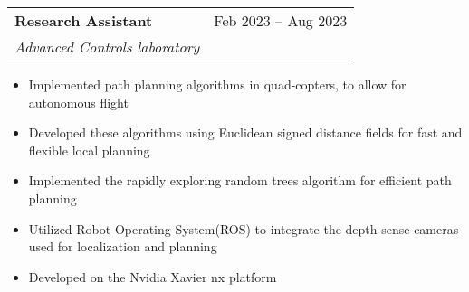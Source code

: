 \documentclass[letterpaper,10pt]{article}
\makeatletter
\newcommand{\resumeItem}[1]{
  \item\small{
    {#1 \vspace{-2pt}}
  }
}
\newcommand{\resumeSubheading}[4]{
  \vspace{-2pt}\item
    \begin{tabular*}{0.97\textwidth}[t]{l@{\extracolsep{\fill}}r}
      \textbf{#1} & #2 \\
      \textit{\small#3} & \textit{\small #4} \\
    \end{tabular*}\vspace{-7pt}
}
\newcommand{\resumeItemListStart}{\begin{itemize}}
\newcommand{\resumeItemListEnd}{\end{itemize}\vspace{-5pt}}
\makeatother
\begin{document}
\resumeSubheading
{\normalsize Research Assistant}{Feb 2023 -- Aug 2023}
{Advanced Controls laboratory}{}
\resumeItemListStart
\resumeItem{Implemented path planning algorithms in quad-copters, to allow for autonomous flight}
\resumeItem{Developed these algorithms using Euclidean signed distance fields for fast and flexible local planning}
\resumeItem{Implemented the rapidly exploring random trees algorithm for efficient path planning}
\resumeItem{Utilized Robot Operating System(ROS) to integrate the depth sense cameras used for localization and planning}
\resumeItem{Developed on the Nvidia Xavier nx platform}
\resumeItemListEnd




\end{document}
